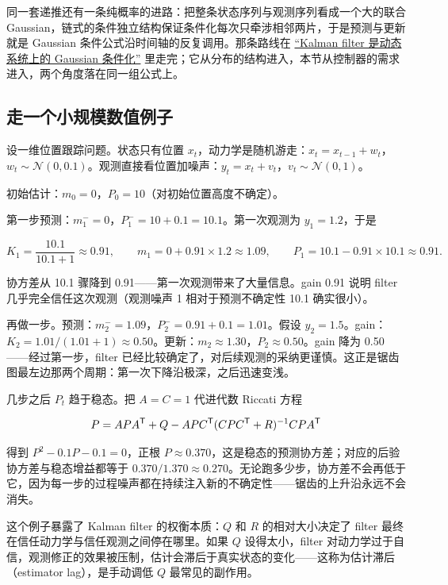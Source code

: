 同一套递推还有一条纯概率的进路：把整条状态序列与观测序列看成一个大的联合 Gaussian，链式的条件独立结构保证条件化每次只牵涉相邻两片，于是预测与更新就是 Gaussian 条件公式沿时间轴的反复调用。那条路线在 \hyperref[sec:13-Machine-Learning/07-Graphical-and-Sequential-Models/03]{``Kalman filter 是动态系统上的 Gaussian 条件化''} 里走完；它从分布的结构进入，本节从控制器的需求进入，两个角度落在同一组公式上。

\subsection{走一个小规模数值例子}

设一维位置跟踪问题。状态只有位置 \(x_t\)，动力学是随机游走：\(x_t = x_{t-1} + w_t\)，\(w_t \sim \mathcal{N}(0, 0.1)\)。观测直接看位置加噪声：\(y_t = x_t + v_t\)，\(v_t \sim \mathcal{N}(0, 1)\)。

初始估计：\(m_0 = 0\)，\(P_0 = 10\)（对初始位置高度不确定）。

第一步预测：\(m_1^- = 0\)，\(P_1^- = 10 + 0.1 = 10.1\)。第一次观测为 \(y_1 = 1.2\)，于是

\[
K_1 = \frac{10.1}{10.1 + 1} \approx 0.91,
\qquad
m_1 = 0 + 0.91 \times 1.2 \approx 1.09,
\qquad
P_1 = 10.1 - 0.91 \times 10.1 \approx 0.91.
\]

协方差从 10.1 骤降到 0.91——第一次观测带来了大量信息。gain 0.91 说明 filter 几乎完全信任这次观测（观测噪声 1 相对于预测不确定性 10.1 确实很小）。

再做一步。预测：\(m_2^- = 1.09\)，\(P_2^- = 0.91 + 0.1 = 1.01\)。假设 \(y_2 = 1.5\)。gain：\(K_2 = 1.01 / (1.01 + 1) \approx 0.50\)。更新：\(m_2 \approx 1.30\)，\(P_2 \approx 0.50\)。gain 降为 0.50——经过第一步，filter 已经比较确定了，对后续观测的采纳更谨慎。这正是锯齿图最左边那两个周期：第一次下降沿极深，之后迅速变浅。

几步之后 \(P_t\) 趋于稳态。把 \(A = C = 1\) 代进代数 Riccati 方程

\[
P = A P A^{\mathsf{T}} + Q - A P C^{\mathsf{T}}(C P C^{\mathsf{T}} + R)^{-1} C P A^{\mathsf{T}}
\]

得到 \(P^2 - 0.1P - 0.1 = 0\)，正根 \(P \approx 0.370\)，这是稳态的预测协方差；对应的后验协方差与稳态增益都等于 \(0.370/1.370 \approx 0.270\)。无论跑多少步，协方差不会再低于它，因为每一步的过程噪声都在持续注入新的不确定性——锯齿的上升沿永远不会消失。

这个例子暴露了 Kalman filter 的权衡本质：\(Q\) 和 \(R\) 的相对大小决定了 filter 最终在信任动力学与信任观测之间停在哪里。如果 \(Q\) 设得太小，filter 对动力学过于自信，观测修正的效果被压制，估计会滞后于真实状态的变化——这称为估计滞后（estimator lag），是手动调低 \(Q\) 最常见的副作用。

